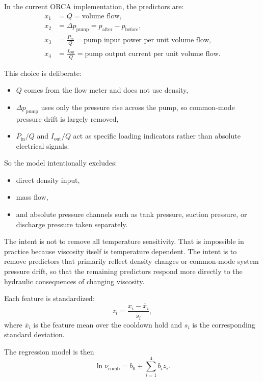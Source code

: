 \documentclass[11pt]{article}
\begin{document}
In the current ORCA implementation, the predictors are:
\begin{align}
    x_1 &= Q = \text{volume flow}, \\
    x_2 &= \Delta p_{\mathrm{pump}} = p_{\mathrm{after}} - p_{\mathrm{before}}, \\
    x_3 &= \frac{P_{\mathrm{in}}}{Q} = \text{pump input power per unit volume flow}, \\
    x_4 &= \frac{I_{\mathrm{out}}}{Q} = \text{pump output current per unit volume flow}.
\end{align}

This choice is deliberate:
\begin{itemize}
    \item $Q$ comes from the flow meter and does not use density,
    \item $\Delta p_{\mathrm{pump}}$ uses only the pressure rise across the
          pump, so common-mode pressure drift is largely removed,
    \item $P_{\mathrm{in}}/Q$ and $I_{\mathrm{out}}/Q$ act as specific loading
          indicators rather than absolute electrical signals.
\end{itemize}

So the model intentionally excludes:
\begin{itemize}
    \item direct density input,
    \item mass flow,
    \item and absolute pressure channels such as tank pressure, suction
          pressure, or discharge pressure taken separately.
\end{itemize}

The intent is not to remove all temperature sensitivity. That is impossible in
practice because viscosity itself is temperature dependent. The intent is to
remove predictors that primarily reflect density changes or common-mode system
pressure drift, so that the remaining predictors respond more directly to the
hydraulic consequences of changing viscosity.

Each feature is standardized:
\begin{equation}
    z_i = \frac{x_i - \bar{x}_i}{s_i},
\end{equation}
where $\bar{x}_i$ is the feature mean over the cooldown hold and $s_i$ is the
corresponding standard deviation.

The regression model is then
\begin{equation}
    \ln \nu_{\mathrm{comb}} = b_0 + \sum_{i=1}^{4} b_i z_i.
\end{equation}
\end{document}
